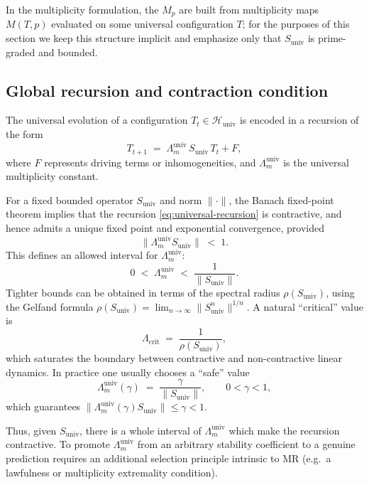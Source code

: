 \documentclass[11pt,a4paper]{article}
\newcommand{\LambdaMuniv}{\Lambda_{m}^{\mathrm{univ}}}
\begin{document}
In the multiplicity formulation, the $M_p$ are built from multiplicity
maps $M(T,p)$ evaluated on some universal configuration $T$; for the
purposes of this section we keep this structure implicit and emphasize
only that $S_{\text{univ}}$ is prime-graded and bounded.

\subsection{Global recursion and contraction condition}

The universal evolution of a configuration $T_t \in \mathcal{H}_{\text{univ}}$
is encoded in a recursion of the form
\begin{equation}
  T_{t+1}
  \;=\;
  \LambdaMuniv\,S_{\text{univ}}\,T_t + F,
  \label{eq:universal-recursion}
\end{equation}
where $F$ represents driving terms or inhomogeneities, and
$\LambdaMuniv$ is the universal multiplicity constant.

For a fixed bounded operator $S_{\text{univ}}$ and norm
$\|\cdot\|$, the Banach fixed-point theorem implies that the recursion
\eqref{eq:universal-recursion} is contractive, and hence admits a unique
fixed point and exponential convergence, provided
\begin{equation}
  \|\LambdaMuniv S_{\text{univ}}\|
  \;<\;
  1.
  \label{eq:contraction-condition}
\end{equation}
This defines an allowed interval for $\LambdaMuniv$:
\begin{equation}
  0 \;<\; \LambdaMuniv
  \;<\; \frac{1}{\|S_{\text{univ}}\|}.
\end{equation}
Tighter bounds can be obtained in terms of the spectral radius
$\rho(S_{\text{univ}})$, using the Gelfand formula
$\rho(S_{\text{univ}}) = \lim_{n\to\infty} \|S_{\text{univ}}^n\|^{1/n}$.
A natural ``critical'' value is
\begin{equation}
  \Lambda_{\text{crit}}
  \;=\;
  \frac{1}{\rho(S_{\text{univ}})},
\end{equation}
which saturates the boundary between contractive and non-contractive
linear dynamics. In practice one usually chooses a ``safe'' value
\begin{equation}
  \LambdaMuniv(\gamma)
  \;=\;
  \frac{\gamma}{\|S_{\text{univ}}\|},
  \qquad 0 < \gamma < 1,
  \label{eq:Lambda-gamma}
\end{equation}
which guarantees $\|\LambdaMuniv(\gamma) S_{\text{univ}}\| \le \gamma < 1$.

Thus, given $S_{\text{univ}}$, there is a whole interval of
$\LambdaMuniv$ which make the recursion contractive. To promote
$\LambdaMuniv$ from an arbitrary stability coefficient to a genuine
prediction requires an additional selection principle intrinsic to MR
(e.g.\ a lawfulness or multiplicity extremality condition).
\end{document}
